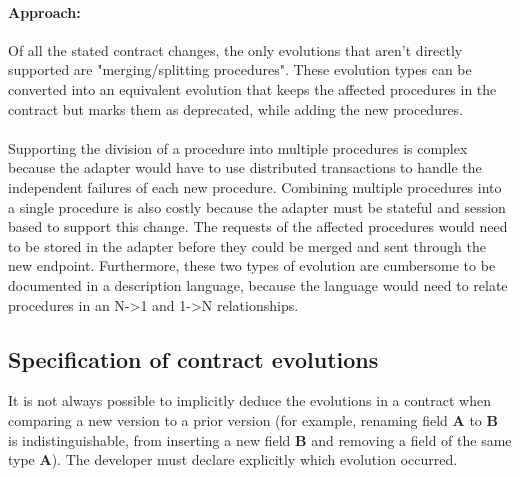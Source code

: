 \paragraph{Approach:}
Of all the stated contract changes, the only evolutions that aren't directly supported are "merging/splitting procedures".
These evolution types can be converted into an equivalent evolution that keeps the affected procedures in the contract but marks them as deprecated, while adding the new procedures.

\paragraph{}
Supporting the division of a procedure into multiple procedures is complex because the adapter would have to use distributed transactions to handle the independent failures of each new procedure.
Combining multiple procedures into a single procedure is also costly because the adapter must be stateful and session based to support this change.
The requests of the affected procedures would need to be stored in the adapter before they could be merged and sent through the new endpoint.
Furthermore, these two types of evolution are cumbersome to be documented in a description language, because the language would need to relate procedures in an N->1 and 1->N relationships.

\subsection{Specification of contract evolutions} %
\label{sec:evolution_specification}

It is not always possible to implicitly deduce the evolutions in a contract when comparing a new version to a prior version
(for example, renaming field \textbf{A} to \textbf{B} is indistinguishable, from inserting a new field \textbf{B} and removing a field of the same type \textbf{A}).
The developer must declare explicitly which evolution occurred.

